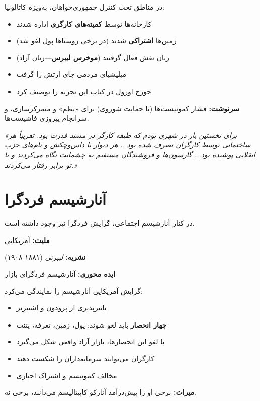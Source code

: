 \begin{historybox}
در مناطق تحت کنترل جمهوری‌خواهان، به‌ویژه کاتالونیا:
\begin{itemize}[nosep]
    \item کارخانه‌ها توسط \textbf{کمیته‌های کارگری} اداره شدند
    \item زمین‌ها \textbf{اشتراکی} شدند (در برخی روستاها پول لغو شد)
    \item زنان نقش فعال گرفتند (\textbf{موخرس لیبرس}—زنان آزاد)
    \item میلیشیای مردمی جای ارتش را گرفت
    \item جورج اورول در کتاب  این تجربه را توصیف کرد
\end{itemize}

\textbf{سرنوشت:} فشار کمونیست‌ها (با حمایت شوروی) برای «نظم» و متمرکزسازی، و سرانجام پیروزی فاشیست‌ها.
\end{historybox}

\begin{quotebox}
\textit{«برای نخستین بار در شهری بودم که طبقه کارگر در مسند قدرت بود. تقریباً هر ساختمانی توسط کارگران تصرف شده بود... هر دیوار با داس‌وچکش و نام‌های حزب انقلابی پوشیده بود... گارسون‌ها و فروشندگان مستقیم به چشمانت نگاه می‌کردند و با تو برابر رفتار می‌کردند.»}
\end{quotebox}

\section{آنارشیسم فردگرا}

در کنار آنارشیسم اجتماعی، گرایش فردگرا نیز وجود داشته است.

\begin{personbox}

\textbf{ملیت:} آمریکایی

\textbf{نشریه:} \textit{لیبرتی} (۱۸۸۱-۱۹۰۸)

\textbf{ایده محوری:} آنارشیسم فردگرای بازار

\mediumspace

 گرایش آمریکایی آنارشیسم را نمایندگی می‌کرد:

\begin{itemize}[nosep]
    \item تأثیرپذیری از پرودون و اشتیرنر
    \item \textbf{چهار انحصار} باید لغو شوند: پول، زمین، تعرفه، پتنت
    \item با لغو این انحصارها، بازار آزاد واقعی شکل می‌گیرد
    \item کارگران می‌توانند سرمایه‌داران را شکست دهند
    \item مخالف کمونیسم و اشتراک اجباری
\end{itemize}

\mediumspace

\textbf{میراث:} برخی او را پیش‌درآمد آنارکو-کاپیتالیسم می‌دانند، برخی نه.
\end{personbox}

